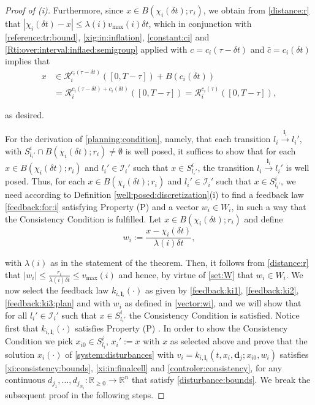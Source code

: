 \documentclass[reqno]{amsart}
\theoremstyle{plain}
\theoremstyle{definition}
\numberwithin{equation}{section}
\begin{document}
\begin{proof}[Proof of (i)]
\noindent Furthermore, since $x\in B(\chi_i(\delta t);r_i)$, we obtain from \eqref{distance:r} that $|\chi_i(\delta t)-x|\le\lambda(i)v_{\max}(i)\delta t$, which in conjunction with \eqref{reference:tr:bound}, \eqref{xig:in:inflation}, \eqref{constant:ci} and \eqref{Rti:over:interval:inflaed:semigroup} applied with $c=c_i(\tau-\delta t)$ and $\bar{c}=c_i(\delta t)$ implies that
\begin{align} \label{x:in:biger:reach}
x & \in  {\ensuremath{\mathcal{R}}}_i^{c_i(\tau-\delta t)}([0,T-\tau])+B(c_i(\delta t)) \nonumber \\
& = {\ensuremath{\mathcal{R}}}_i^{c_i(\tau-\delta t)+c_i(\delta t)}([0,T-\tau])= {\ensuremath{\mathcal{R}}}_i^{c_i(\tau)}([0,T-\tau]),
\end{align}

\noindent as desired.

For the derivation of \eqref{planning:condition}, namely, that each transition $l_i\overset{{\textbf{{l}}}_i}{\longrightarrow}l_i'$, with $S_{l_i'}^i\cap B(\chi_i(\delta t);r_i)\ne\emptyset$ is well posed, it suffices to show that for each $x\in B(\chi_i(\delta t);r_i)$ and $l_i'\in{\ensuremath{\mathcal{I}}}_i'$ such that $x\in S_{l_i'}^i$, the transition $l_i\overset{{\textbf{{l}}}_i}{\longrightarrow}l_i'$ is well posed. Thus, for each $x\in B(\chi_i(\delta t);r_i)$ and $l_i'\in{\ensuremath{\mathcal{I}}}_i'$ such that $x\in S_{l_i'}^i$, we need according to Definition \ref{well:posed:discretization}(i) to find a feedback law \eqref{feedback:for:i} satisfying Property (P) and a vector $w_i\in W_i$, in such a way that the Consistency Condition is fulfilled. Let $x\in B(\chi_i(\delta t);r_i)$ and define
\begin{equation}  \label{vector:wi}
w_i:= \frac{x-\chi_i(\delta t)}{\lambda(i)\delta t},
\end{equation}

\noindent with $\lambda(i)$ as in the statement of the theorem. Then, it follows from \eqref{distance:r} that $|w_i|\le \frac{r_i}{\lambda(i)\delta t}\le v_{\max}(i)$ and hence, by virtue of \eqref{set:W} that $w_i\in W_i$. We now select the feedback law $k_{i,{\textbf{{l}}}_i}(\cdot)$ as given by \eqref{feedback:ki1}, \eqref{feedback:ki2}, \eqref{feedback:ki3:plan} and with $w_i$ as defined in \eqref{vector:wi}, and we will show that for all $l_i'\in{\ensuremath{\mathcal{I}}}_i'$ such that $x\in S_{l_i'}^i$ the Consistency Condition is satisfied. Notice first that $k_{i,{\textbf{{l}}}_i}(\cdot)$ satisfies Property (P) . In order to show the Consistency Condition we pick  $x_{i0}\in S_{l_i}^i$, $x_i':=x$ with $x$ as selected above and prove that the solution $x_i(\cdot)$ of \eqref{system:disturbances} with $v_i=k_{i,{\textbf{{l}}}_i}(t,x_i,{\textbf{{d}}}_j;x_{i0},w_i)$ satisfies \eqref{xi:consistency:bounds}, \eqref{xi:in:finalcell} and \eqref{controler:consistency}, for any continuous $d_{j_1},\ldots,d_{j_{N_i}}:{\ensuremath{\mathbb{R}_{ \geq 0}}}\to{\ensuremath{\mathbb{R}^{{n}}}}$ that satisfy \eqref{disturbance:bounds}. We break the subsequent proof in the following steps.


\end{proof}
\end{document}
